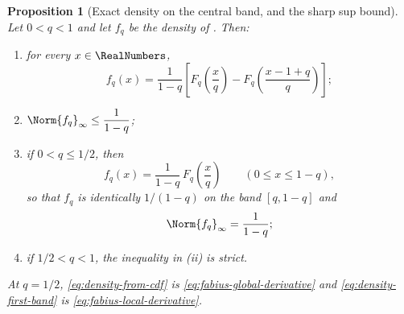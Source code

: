 \documentclass[11pt,a4paper,oneside,openany]{book}
\newtheorem{proposition}[proposition]{Proposition}
\theoremstyle{definition}
\theoremstyle{remark}
\begin{document}
\begin{proposition}[Exact density on the central band, and the sharp sup bound]\label{prop:geometric-uniform-density-band}
Let $0<q<1$ and let $f_q$ be the density of
.  Then:
\begin{enumerate}
\item for every $x\in\RealNumbers$,
\begin{equation}\label{eq:density-from-cdf}
 f_q(x)=\frac1{1-q}
 \left[F_q\!\left(\frac xq\right)-F_q\!\left(\frac{x-1+q}{q}\right)\right];
\end{equation}
\item $\Norm{f_q}_\infty\le\dfrac1{1-q}$;
\item if $0<q\le1/2$, then
\begin{equation}\label{eq:density-first-band}
 f_q(x)=\frac1{1-q}\,F_q\!\left(\frac xq\right)
 \qquad(0\le x\le1-q),
\end{equation}
so that $f_q$ is identically $1/(1-q)$ on the band $[q,1-q]$ and
\begin{equation}\label{eq:density-sup-exact}
 \Norm{f_q}_\infty=\frac1{1-q};
\end{equation}
\item if $1/2<q<1$, the inequality in (ii) is strict.
\end{enumerate}
At $q=1/2$, \eqref{eq:density-from-cdf} is \eqref{eq:fabius-global-derivative} and
\eqref{eq:density-first-band} is \eqref{eq:fabius-local-derivative}.
\end{proposition}
\end{document}
